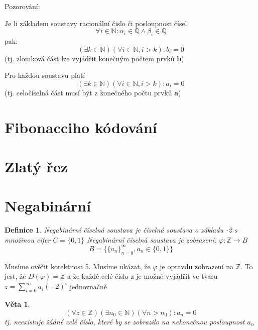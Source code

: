 \documentclass[12pt]{book}
\newtheorem{definice}{Definice}
\newtheorem{veta}{V\v eta}
\begin{document}
\newpage
Pozorování:


Je li základem soustavy racionální čislo či posloupnost čísel
$$\forall i \in \mathbb{N} : \alpha_i \in \mathbb{Q} \land \beta_i \in \mathbb{Q}$$
pak:
$$ (\exists k \in \mathbb{N} )(\forall i \in \mathbb{N}, i>k): b_i = 0 $$
(tj. zlomková část lze vyjádřit konečným počtem prvků \textbf{b})\newline \newline

Pro každou soustavu platí
$$ (\exists k \in \mathbb{N} )(\forall i \in \mathbb{N}, i>k): a_i = 0 $$
(tj. celočíselná část musí být  z konečného počtu prvků \textbf{a})



\newpage

\section{Fibonacciho kódování}

\newpage

\section{Zlatý řez}

\newpage

\section{Negabinární}

\begin{definice}
	Negabinární číselná soustava je číselná soustava o základu -2 s množinou cifer $C=\{0,1\}$\newline
	Negabinární číselná soustava je zobrazení:
	$\varphi:\mathbb{Z}\to B$
	 $$B=\{\{a_n\}_{n=0}^\infty,a_n \in \{0,1\} \}$$
\end{definice}
Musíme ověřit korektnost 5. Musíme ukázat, že $\varphi$ je opravdu zobrazení na $\mathbb{Z}$. To jest, že $D(\varphi)=\mathbb{Z}$ a že každé celé číslo z je možné vyjádřit ve tvaru $z=\sum_{i=0}^\infty a_i(-2)^i$ jednoznačně

\begin{veta}
	$$(\forall z \in \mathbb{Z})(\exists n_0 \in \mathbb{N}) (\forall n > n_0) : a_n = 0$$tj. neexistuje žádné celé číslo, které by se zobrazilo na nekonečnou posloupnost $a_n$
	\end{veta}
\end{document}
